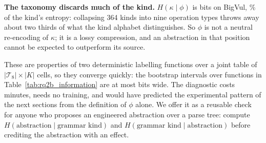 \textbf{The taxonomy discards much of the kind.} $H(\kappa \mid \phi)$ is
\numbigvulHKindGivenPhi{} bits on BigVul, \numbigvulKindLost\% of the kind's
entropy: collapsing 364 kinds into nine operation types throws away about two
thirds of what the kind alphabet distinguishes. So $\phi$ is not a neutral
re-encoding of $\kappa$; it is a lossy compression, and an abstraction in that
position cannot be expected to outperform its source.

These are properties of two deterministic labelling functions over a joint
table of $|\mathcal{T}_8| \times |K|$ cells, so they converge quickly: the
bootstrap intervals over functions in Table~\ref{tab:rq2b_information} are
at most \numkindGivenPhiCiWidthMax{} bits wide. The diagnostic costs minutes, needs no training, and
would have predicted the experimental pattern of the next sections from the
definition of $\phi$ alone. We offer it as a reusable check for anyone who
proposes an engineered abstraction over a parse tree: compute
$H(\text{abstraction} \mid \text{grammar kind})$ and $H(\text{grammar kind}
\mid \text{abstraction})$ before crediting the abstraction with an effect.
